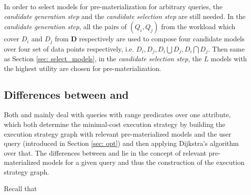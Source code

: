 In order to select models for pre-materialization for arbitrary queries, the {\em candidate generation step} and the {\em candidate selection step} are still needed. In the {\em candidate generation step}, all the pairs of $(Q_i, Q_j)$ from the workload which cover $D_i$ and $D_j$ from $\textbf{D}$ respectively are used to compose four candidate models over four set of data points respectively, i.e. $D_i, D_j, D_i \bigcup D_j, D_i \bigcap D_j$. Then same as Section \ref{sec: select_models}, in the {\em candidate selection step}, the $L$ models with the highest utility are chosen for pre-materialization.

\subsection{Differences between \cite{hasani2018efficient} and \cite{gupta2015processing}}
Both \cite{hasani2018efficient} and \cite{gupta2015processing} mainly deal with queries with range predicates over one attribute, which both determine the minimal-cost execution strategy by building the execution strategy graph with relevant pre-materialized models and the user query (introduced in Section \ref{sec: opt}) and then applying Dijkstra's algorithm over that. The differences between \cite{hasani2018efficient} and \cite{gupta2015processing} lie in the concept of relevant pre-materialized models for a given query and thus the construction of the execution strategy graph.

Recall that